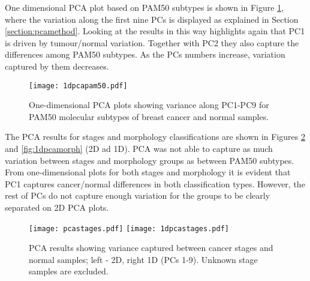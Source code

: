     \newpage
    One dimensional PCA plot based on PAM50 subtypes is shown in Figure \ref{fig:1dpcapam50}, where the variation along the first nine PCs is displayed as explained in Section \ref{section:pcamethod}. Looking at the results in this way highlights again that PC1 is driven by tumour/normal variation. Together with PC2 they also capture the differences among PAM50 subtypes. As the PCs numbers increase, variation captured by them decreases. 
    
            \begin{figure}[!h]
            \centering
            \texttt{[image: 1dpcapam50.pdf]}
            \caption[PCA plot showing separation by PAM50 subtypes (1D)]{One-dimensional PCA plots showing variance along PC1-PC9 for PAM50 molecular subtypes of breast cancer and normal samples. }
            \label{fig:1dpcapam50}
            \end{figure}
    
    
    The PCA results for stages and morphology classifications are shown in Figures \ref{fig:1dpcastage} and \ref{fig:1dpcamorph} (2D ad 1D). PCA was not able to capture as much variation between stages and morphology groups as between PAM50 subtypes. From one-dimensional plots for both stages and morphology it is evident that PC1 captures cancer/normal differences in both classification types. However, the rest of PCs do not capture enough variation for the groups to be clearly separated on 2D PCA plots. 
    
            
            \begin{figure}[!h]
            \hspace*{\fill}
            \texttt{[image: pcastages.pdf]}\hfill
            \texttt{[image: 1dpcastages.pdf]}
            \hspace*{\fill}
            \caption[PCA plots showing separation by cancer stages (2D and 1D) ]{PCA results showing variance captured between cancer stages and normal samples; left - 2D, right 1D (PCs 1-9). Unknown stage samples are excluded.}
            \label{fig:1dpcastage}
            \end{figure}
            
